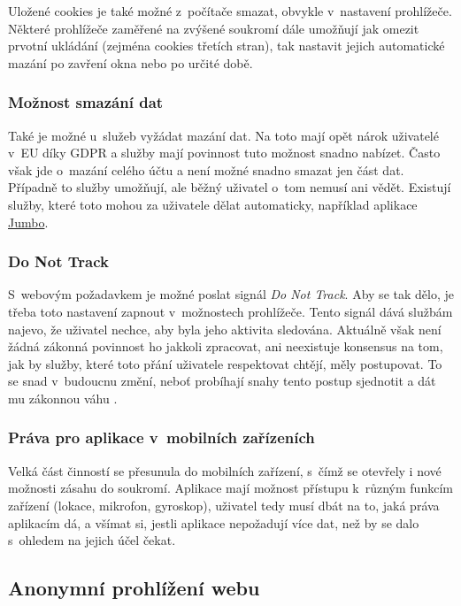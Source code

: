 Uložené cookies je také možné z~počítače smazat, obvykle v~nastavení prohlížeče. Některé prohlížeče zaměřené na zvýšené soukromí dále umožňují jak omezit prvotní ukládání (zejména cookies třetích stran), tak nastavit jejich automatické mazání po zavření okna nebo po určité době.

\subsubsection*{Možnost smazání dat}
Také je možné u~služeb vyžádat mazání dat. Na toto mají opět nárok uživatelé v~EU díky GDPR a služby mají povinnost tuto možnost snadno nabízet. Často však jde o~mazání celého účtu a není možné snadno smazat jen část dat. Případně to služby umožňují, ale běžný uživatel o~tom nemusí ani vědět. Existují služby, které toto mohou za uživatele dělat automaticky, například aplikace \href{https://www.jumboprivacy.com}{Jumbo}. 

\subsubsection*{Do Not Track}
S~webovým požadavkem je možné poslat signál \textit{Do Not Track}. Aby se tak dělo, je třeba toto nastavení zapnout v~možnostech prohlížeče. Tento signál dává službám najevo, že uživatel nechce, aby byla jeho aktivita sledována. Aktuálně však není žádná zákonná povinnost ho jakkoli zpracovat, ani neexistuje konsensus na tom, jak by služby, které toto přání uživatele respektovat chtějí, měly postupovat. To se snad v~budoucnu změní, neboť probíhají snahy tento postup sjednotit a dát mu zákonnou váhu \citep{do-not-track-future}.

\subsubsection*{Práva pro aplikace v~mobilních zařízeních}
Velká část činností se přesunula do mobilních zařízení, s~čímž se otevřely i nové možnosti zásahu do soukromí. Aplikace mají možnost přístupu k~různým funkcím zařízení (lokace, mikrofon, gyroskop), uživatel tedy musí dbát na to, jaká práva aplikacím dá, a všímat si, jestli aplikace nepožadují více dat, než by se dalo s~ohledem na jejich účel čekat.

\subsection{Anonymní prohlížení webu}

